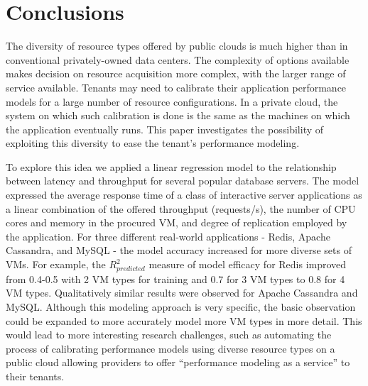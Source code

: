 
%
%

\section{Conclusions}
\label{sec:conclus}
\vspace{10pt}

The diversity of resource types offered by public clouds is much higher than in conventional privately-owned data centers. The complexity of options available makes decision on resource acquisition more complex, with the larger range of service available. Tenants may need to calibrate their application performance models for a large number of resource configurations. In a private cloud, the system on which such calibration is done is the same as the machines on which the application eventually runs. This paper investigates the possibility of exploiting this diversity to ease the tenant's performance modeling.  

To explore this idea we applied a linear regression model to the relationship between latency and throughput for several popular database servers. The model expressed the average response time of a class of interactive server applications as a linear combination of the offered throughput (requests/s), the number of CPU cores and memory in the procured VM, and degree of replication employed by the application. For three different real-world applications - Redis, Apache Cassandra, and MySQL -  the model accuracy increased for more diverse sets of VMs. 
For example, the $R^2_{predicted}$ measure of model efficacy for Redis improved from 0.4-0.5 with 2 VM types for training and 0.7 for 3 VM types to 0.8 for 4 VM types. Qualitatively similar results were observed for Apache Cassandra and MySQL. 
Although this modeling approach is very specific, the basic observation could be expanded to more accurately model more VM types in more detail.  This would lead to more interesting research challenges, such as automating the process of calibrating performance models using diverse resource types on a public cloud allowing providers to offer ``performance modeling as a service'' to their tenants. 

